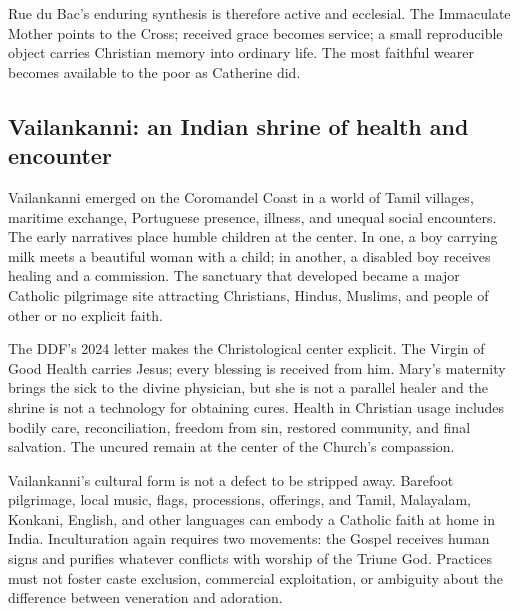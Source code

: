 Rue du Bac's enduring synthesis is therefore active and ecclesial. The Immaculate Mother points to the Cross; received grace becomes service; a small reproducible object carries Christian memory into ordinary life. The most faithful wearer becomes available to the poor as Catherine did.

\subsection{Vailankanni: an Indian shrine of health and encounter}

\enlargethispage{\baselineskip}

Vailankanni emerged on the Coromandel Coast in a world of Tamil villages, maritime exchange, Portuguese presence, illness, and unequal social encounters. The early narratives place humble children at the center. In one, a boy carrying milk meets a beautiful woman with a child; in another, a disabled boy receives healing and a commission. The sanctuary that developed became a major Catholic pilgrimage site attracting Christians, Hindus, Muslims, and people of other or no explicit faith.

The DDF's 2024 letter makes the Christological center explicit. The Virgin of Good Health carries Jesus; every blessing is received from him. Mary's maternity brings the sick to the divine physician, but she is not a parallel healer and the shrine is not a technology for obtaining cures. Health in Christian usage includes bodily care, reconciliation, freedom from sin, restored community, and final salvation. The uncured remain at the center of the Church's compassion.

Vailankanni's cultural form is not a defect to be stripped away. Barefoot pilgrimage, local music, flags, processions, offerings, and Tamil, Malayalam, Konkani, English, and other languages can embody a Catholic faith at home in India. Inculturation again requires two movements: the Gospel receives human signs and purifies whatever conflicts with worship of the Triune God. Practices must not foster caste exclusion, commercial exploitation, or ambiguity about the difference between veneration and adoration.

